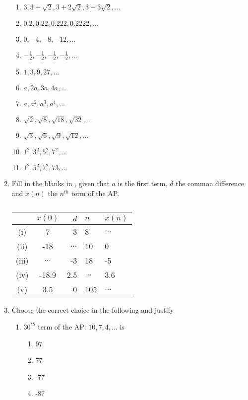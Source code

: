 \begin{enumerate}[label=\thesubsection.\arabic*, ref=\thesubsection.\theenumi]
\begin{multicols}{2}
\begin{enumerate}[itemsep=1ex]
\item $3, 3+\sqrt{2},  3+2\sqrt{2},  3+3\sqrt{2}, \dots $
\item $0.2,  0.22,  0.222,  0.2222,  \dots $
\item $0,  -4,  -8,  -12,  \dots $
\item $-\frac{1}{2},  -\frac{1}{2},  -\frac{1}{2},  -\frac{1}{2}, \dots $
\item $1,  3,  9,  27, \dots $ 
\item $a,  2a,  3a,  4a, \dots $ 
\item $a,  a^2,  a^3,  a^4, \dots $
\item $\sqrt{2},  \sqrt{8},  \sqrt{18},  \sqrt{32}, \dots $
\item $\sqrt{3},  \sqrt{6},  \sqrt{9},  \sqrt{12}, \dots $
\item $1^2,  3^2,  5^2,  7^2, \dots$
\item $1^2,  5^2,  7^2,  73, \dots $
\end{enumerate}
\end{multicols}
\item Fill in the blanks in 
	,  given that $a$ is the first term,  $d$ the common
difference and $x(n)$ the $n^{th}$ term of the AP.
\begin{table}[H]
	\centering
\begin{tabular}{|c|c|r|l|l|}
\hline
&$x(0)$& $d$ & $n$ & $x(n)$
\\
\hline
(i)& 	7 &3 &8 &$\dots $ 
\\
(ii)& 	-18 &$\dots $  &10  &0
\\
(iii)& 	$\dots $  &-3 &18 &-5
\\
(iv)& 	-18.9 &2.5 &$\dots $  &3.6
\\
(v)& 	3.5 &0 &105 &$\dots $ 
\\
\hline
\end{tabular}
	\caption{}
	\label{table:ap}
\end{table}
\item Choose the correct choice in the following and justify 
\begin{enumerate}
	\item $30^{th}$ term of the AP: $10,  7,  4, \dots $   is
	\begin{multicols}{4}
\begin{enumerate}
\item 97
\item 77
\item -77
\item -87
\end{enumerate}

\end{multicols}
\end{enumerate}
\end{enumerate}
